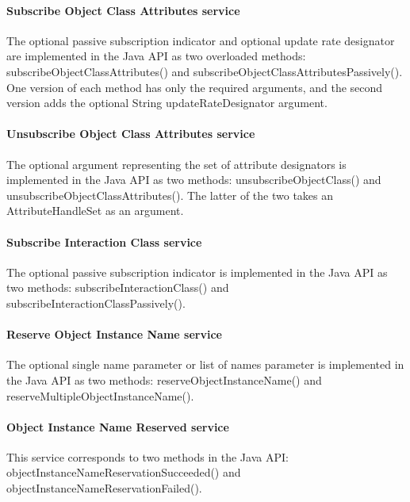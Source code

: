 \begin{compactstdpage}
    \paragraph{Subscribe Object Class Attributes service}

    The optional passive subscription indicator and optional update rate designator are implemented in the Java API as two overloaded methods: subscribeObjectClassAttributes() and subscribeObjectClassAttributesPassively(). One version of each method has only the required arguments, and the second version adds the optional String updateRateDesignator argument.

    \paragraph{Unsubscribe Object Class Attributes service}

    The optional argument representing the set of attribute designators is implemented in the Java API as two methods: unsubscribeObjectClass() and unsubscribeObjectClassAttributes(). The latter of the two takes an AttributeHandleSet as an argument.

    \paragraph{Subscribe Interaction Class service}

    The optional passive subscription indicator is implemented in the Java API as two methods: subscribeInteractionClass() and subscribeInteractionClassPassively().

    \paragraph{Reserve Object Instance Name service}

    The optional single name parameter or list of names parameter is implemented in the Java API as two methods: reserveObjectInstanceName() and reserveMultipleObjectInstanceName().

    \paragraph{Object Instance Name Reserved \rtiinitiated{} service}

    This service corresponds to two methods in the Java API: objectInstanceNameReservationSucceeded() and objectInstanceNameReservationFailed().


\end{compactstdpage}
